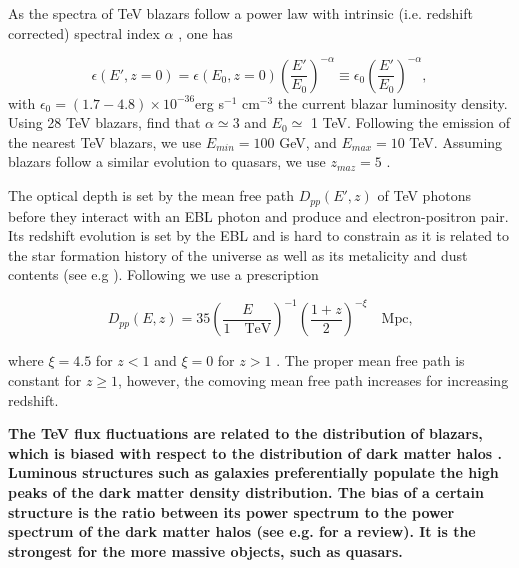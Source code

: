 \documentclass[twocolumns]{emulateapj}
\newcommand\ALc[1]{{\color{red} \bf #1}} %
\begin{document}
{As the spectra of TeV blazars follow a power law with intrinsic (i.e. redshift corrected) spectral index $\alpha$ , one has

\begin{equation}
  \label{eq:blaz_lum}
  \epsilon(E',z=0)=\epsilon(E_0,z=0)\left(\frac{E'}{E_0}\right)^{-\alpha}\equiv \epsilon_0\left(\frac{E'}{E_0}\right)^{-\alpha},
\end{equation}
with $\epsilon_0=(1.7-4.8)\times 10^{-36}$erg s$^{-1}$ cm$^{-3}$ the current blazar luminosity density. Using 28 TeV blazars, \citet{2012ApJ...752...23C} find that $\alpha\simeq 3$ and $E_0\simeq $ 1 TeV. Following the emission of the nearest TeV blazars, we use $E_{min}=100$ GeV,  and $E_{max}=10$ TeV. Assuming blazars follow a similar evolution to quasars, we use $z_{maz}=5$  \citep{2007ApJ...654..731H}.

The optical depth is set by the mean free path  $D_{pp}(E',z)$ of  TeV photons before they interact with an EBL photon and produce and electron-positron pair. Its redshift evolution is set by the EBL and is hard to constrain as it is related to the star formation history of the universe as well as its metalicity and dust contents (see e.g \citet{2008A&A...487..837F,2006ApJ...648..774S}).  Following \citet{2012ApJ...752...23C} we use  a prescription 

  \begin{equation}
    \label{eq:mean_free_path}
  D_{pp}(E,z)=35\left(\frac{E}{1 \quad\textrm{TeV}}\right)^{-1} \left(\frac{1+z}{2}\right)^{-\xi} \quad \textrm{Mpc,}   
  \end{equation}

where $\xi=4.5$ for $z<1$ and $\xi=0$ for $z>1$ \citep{2004A&A...413..807K,2009PhRvD..80l3012N}. The proper mean free path is constant for $z\geq 1$, however, the comoving mean free path increases for increasing redshift.


\ALc{The TeV flux fluctuations are related to the distribution of blazars, which is biased with respect to the distribution of dark matter halos \citep{1996MNRAS.282..347M}. Luminous structures such as galaxies preferentially populate the high peaks of the dark matter density distribution.  The bias of a certain structure is the ratio between its power spectrum to the power spectrum of the dark matter halos (see e.g. \citet{2002PhR...372....1C} for a review). It is the strongest for the more massive objects, such as quasars. 

}}
\end{document}
